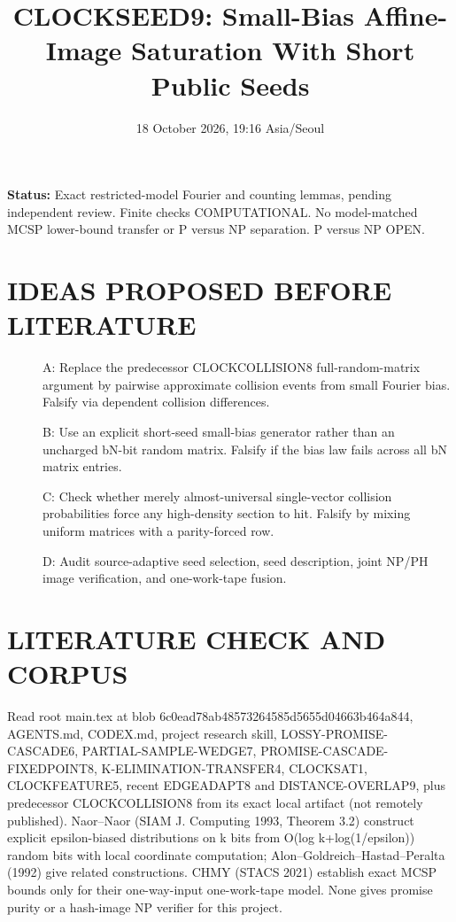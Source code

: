 \documentclass[11pt]{article}
\title{CLOCKSEED9: Small-Bias Affine-Image Saturation With Short Public Seeds}
\date{18 October 2026, 19:16 Asia/Seoul}
\begin{document}
\maketitle
\noindent\textbf{Status:} Exact restricted-model Fourier and counting lemmas, pending independent review. Finite checks COMPUTATIONAL. No model-matched MCSP lower-bound transfer or P versus NP separation. P versus NP OPEN.
\section*{IDEAS PROPOSED BEFORE LITERATURE}
\begin{description}
\item[] A: Replace the predecessor CLOCKCOLLISION8 full-random-matrix argument by pairwise approximate collision events from small Fourier bias. Falsify via dependent collision differences.
\item[] B: Use an explicit short-seed small-bias generator rather than an uncharged bN-bit random matrix. Falsify if the bias law fails across all bN matrix entries.
\item[] C: Check whether merely almost-universal single-vector collision probabilities force any high-density section to hit. Falsify by mixing uniform matrices with a parity-forced row.
\item[] D: Audit source-adaptive seed selection, seed description, joint NP/PH image verification, and one-work-tape fusion.
\end{description}
\section*{LITERATURE CHECK AND CORPUS}
Read root main.tex at blob 6c0ead78ab48573264585d5655d04663b464a844, AGENTS.md, CODEX.md, project research skill, LOSSY-PROMISE-CASCADE6, PARTIAL-SAMPLE-WEDGE7, PROMISE-CASCADE-FIXEDPOINT8, K-ELIMINATION-TRANSFER4, CLOCKSAT1, CLOCKFEATURE5, recent EDGEADAPT8 and DISTANCE-OVERLAP9, plus predecessor CLOCKCOLLISION8 from its exact local artifact (not remotely published). Naor--Naor (SIAM J. Computing 1993, Theorem 3.2) construct explicit epsilon-biased distributions on k bits from O(log k+log(1/epsilon)) random bits with local coordinate computation; Alon--Goldreich--Hastad--Peralta (1992) give related constructions. CHMY (STACS 2021) establish exact MCSP bounds only for their one-way-input one-work-tape model. None gives promise purity or a hash-image NP verifier for this project.
\end{document}
